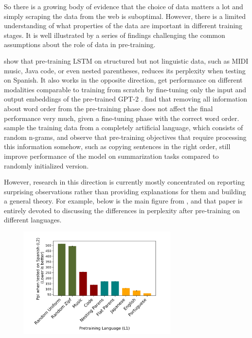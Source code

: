 \documentclass[a4paper, 11pt, oneside]{article}
\begin{document}
	So there is a growing body of evidence that the choice of data matters a lot
	and simply scraping the data from the web is suboptimal. However, there is a
	limited understanding of what properties of the data are important in
	different training stages. It is well illustrated by a series of findings challenging
	the common assumptions about the role of data in pre-training.

	\citet{papadimitriou2020learning} show that pre-training LSTM
	\cite{hochreiter1997long} on structured but not linguistic data, such as MIDI music,
	Java code, or even nested parentheses, reduces its perplexity when testing on
	Spanish. It also works in the opposite direction, \citet{lu2021pretrained} get
	performance on different modalities comparable to training from scratch by fine-tuning
	only the input and output embeddings of the pre-trained GPT-2 \cite{radford2019language}.
	\citet{sinha2021masked} find that removing all information about word order from
	the pre-training phase does not affect the final performance very much, given
	a fine-tuning phase with the correct word order. \citet{krishna2021does}
	sample the training data from a completely artificial language, which consists
	of random n-grams, and observe that pre-training objectives that require
	processing this information somehow, such as copying sentences in the right order,
	still improve performance of the model on summarization tasks compared to
	randomly initialized version.

	However, research in this direction is currently mostly concentrated on reporting
	surprising observations rather than providing explanations for them and building
	a general theory. For example, below is the main figure from \cite{papadimitriou2020learning},
	and that paper is entirely devoted to discussing the differences in perplexity
	after pre-training on different languages.

	\begin{figure}[t]
		\includegraphics[width=8cm]{img/tilt.png}
		\centering
	\end{figure}
\end{document}
